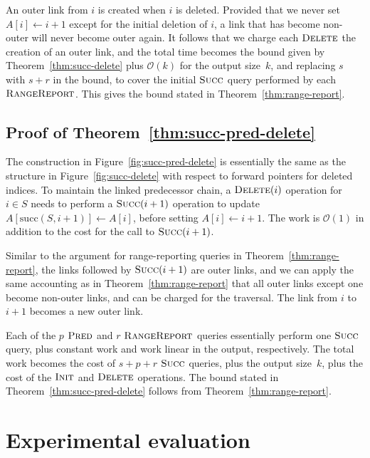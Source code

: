 \documentclass[a4paper]{lipics-v2021}
\newcommand{\Oh}{\mathcal{O}}
\newcommand{\successor}{\mathrm{succ}}
\newcommand{\FuncName}[1]{\textup{\textsc{#1}}}
\newcommand{\Init}{\FuncName{Init}}
\newcommand{\Delete}{\FuncName{Delete}}
\newcommand{\Succ}{\FuncName{Succ}}
\newcommand{\Pred}{\FuncName{Pred}}
\newcommand{\RangeReport}{\FuncName{RangeReport}}
\begin{document}
An outer link from $i$ is created when $i$ is deleted. Provided that we never set $A[i]\leftarrow i+1$ except for the initial deletion of $i$, a link that has become non-outer will never become outer again. It follows that we charge each $\Delete$ the creation of an outer link, and the total time becomes the bound given by Theorem~\ref{thm:succ-delete} plus $\Oh(k)$ for the output size~$k$, and replacing $s$ with $s+r$ in the bound, to cover the initial $\Succ$ query performed by each $\RangeReport$. This gives the bound stated in Theorem~\ref{thm:range-report}.

\subsection{Proof of Theorem~\ref{thm:succ-pred-delete}}

The construction in Figure~\ref{fig:succ-pred-delete} is essentially the same as the structure in Figure~\ref{fig:succ-delete} with respect to forward pointers for deleted indices. To maintain the linked predecessor chain, a $\Delete(i)$ operation for $i \in S$ needs to perform a $\Succ(i+1)$ operation to update $A[\successor(S, i+1)] \leftarrow A[i]$, before setting $A[i] \leftarrow i+1$. The work is $\Oh(1)$ in addition to the cost for the call to $\Succ(i+1)$. 

Similar to the argument for range-reporting queries in Theorem~\ref{thm:range-report}, the links followed by $\Succ(i+1)$ are outer links, and we can apply the same accounting as in Theorem~\ref{thm:range-report} that all outer links except one become non-outer links, and can be charged for the traversal. The link from $i$ to $i+1$ becomes a new outer link.

Each of the $p$ $\Pred$ and $r$ $\RangeReport$ queries essentially perform one $\Succ$ query, plus constant work and work linear in the output, respectively. The total work becomes the cost of $s+p+r$ $\Succ$ queries, plus the output size~$k$, plus the cost of the $\Init$ and $\Delete$ operations. The bound stated in Theorem~\ref{thm:succ-pred-delete} follows from Theorem~\ref{thm:range-report}.

\section{Experimental evaluation}
\label{sec:experiments}
\end{document}
